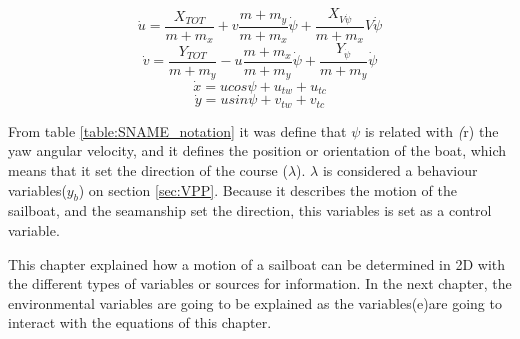 \begin{equation}\label{eq:u_dot}
    \Dot{u}=\frac{X_{TOT}}{m+m_{x}}+v\frac{m+m_{y}}{m+m_{x}} \Dot{\psi}+\frac{X_{V\Dot{\psi}}}{m+m_{x}}V\Dot{\psi}
\end{equation}
\begin{equation}\label{v_dot}
    \Dot{v}=\frac{Y_{TOT}}{m+m_{y}}-u\frac{m+m_{x}}{m+m_{y}} \Dot{\psi}+ \frac{Y_{\Dot{\psi}}}{m+m_{y}}\Dot{\psi}
\end{equation}
\begin{equation}\label{x_dot}
    \Dot{x}=ucos\psi +u_{tw}+u_{tc}
\end{equation}
\begin{equation}\label{y_dot}
    \Dot{y}=usin\psi +v_{tw}+v_{tc}
\end{equation}

From table \ref{table:SNAME_notation} it was define that $\psi$ is related with \textit(r) the yaw angular velocity, and it defines the position or orientation of the boat, which means that it set the direction of the course ($\lambda$).  $\lambda$ is considered a behaviour variables(\textit{$y_{b}$}) on section \ref{sec:VPP}. %
Because it describes the motion of the sailboat, and the seamanship set the direction, this variables is set as a control variable.\par

This chapter explained how a motion of a sailboat can be determined in 2D with the different types of variables or sources for information. In the next chapter, the environmental variables are going to be explained as the variables(e)are going to interact with the equations of this chapter.